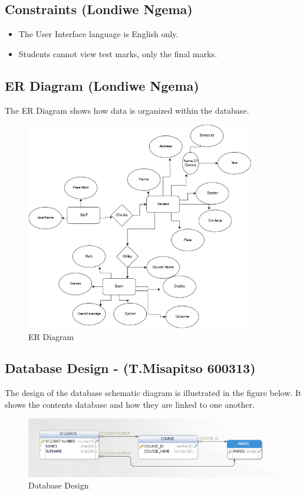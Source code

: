 \documentclass[10pt,onecolumn]{lab}
\begin{document}
\subsection{Constraints (Londiwe Ngema)}
\begin{itemize}
\item The User Interface language is English only.
\item Students cannot view test marks, only the final marks.
\end{itemize}

\newpage

\subsection{ER Diagram (Londiwe Ngema)}
The ER Diagram shows how data is organized within the database.

\begin{center}
\begin{figure}[h]
\centering
\includegraphics[width=10cm]{ER_DIAGRAM}
\caption{ER Diagram}
\end{figure}
\end{center}


\subsection{Database Design - (T.Misapitso 600313) }
The design of the database schematic diagram is illustrated in the figure below. It shows the contents database and how they are linked to one another.

\begin{center}
	\begin{figure}[h]
		\centering
		\includegraphics[scale=0.8, width=16cm]{Schematic}
		\caption{Database Design}
	\end{figure}
\end{center}
\newpage
\end{document}
